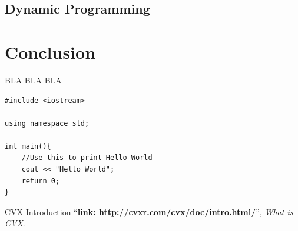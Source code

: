 \documentclass[a4paper]{article}
\begin{document}
\subsection{}

\subsection{}

\subsection{}

\subsection{Dynamic Programming}

\section{Conclusion}
BLA BLA BLA

\pagebreak

\begin{verbatim}
#include <iostream>

using namespace std;

int main(){
    //Use this to print Hello World
    cout << "Hello World";
    return 0;
}
\end{verbatim}
\begin{thebibliography}{80}

CVX Introduction
``\textbf{link: http://cvxr.com/cvx/doc/intro.html/}'',
\textit{What is CVX}.

\end{thebibliography}
\end{document}
